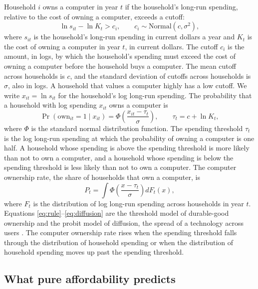 \documentclass[11pt]{article}
\begin{document}
Household $i$ owns a computer in year $t$ if the household's long-run spending, relative to the cost of owning a computer, exceeds a cutoff:
\begin{equation}
\ln s_{it} - \ln K_t > c_i, \qquad c_i \sim \text{Normal}(c, \sigma^2),
\label{eq:rule}
\end{equation}
where $s_{it}$ is the household's long-run spending in current dollars a year and $K_t$ is the cost of owning a computer in year $t$, in current dollars. The cutoff $c_i$ is the amount, in logs, by which the household's spending must exceed the cost of owning a computer before the household buys a computer. The mean cutoff across households is $c$, and the standard deviation of cutoffs across households is $\sigma$, also in logs. A household that values a computer highly has a low cutoff. We write $x_{it} = \ln s_{it}$ for the household's log long-run spending. The probability that a household with log spending $x_{it}$ owns a computer is
\begin{equation}
\Pr(\text{own}_{it} = 1 \mid x_{it}) = \Phi\!\left(\frac{x_{it} - \tau_t}{\sigma}\right), \qquad \tau_t = c + \ln K_t,
\label{eq:prob}
\end{equation}
where $\Phi$ is the standard normal distribution function. The spending threshold $\tau_t$ is the log long-run spending at which the probability of owning a computer is one half. A household whose spending is above the spending threshold is more likely than not to own a computer, and a household whose spending is below the spending threshold is less likely than not to own a computer. The computer ownership rate, the share of households that own a computer, is
\begin{equation}
P_t = \int \Phi\!\left(\frac{x - \tau_t}{\sigma}\right) dF_t(x),
\label{eq:diffusion}
\end{equation}
where $F_t$ is the distribution of log long-run spending across households in year $t$. Equations \eqref{eq:rule}--\eqref{eq:diffusion} are the threshold model of durable-good ownership \citep{bonus1973} and the probit model of diffusion, the spread of a technology across users \citep{david1969,geroski2000}. The computer ownership rate rises when the spending threshold falls through the distribution of household spending or when the distribution of household spending moves up past the spending threshold.

\subsection{What pure affordability predicts}
\end{document}
